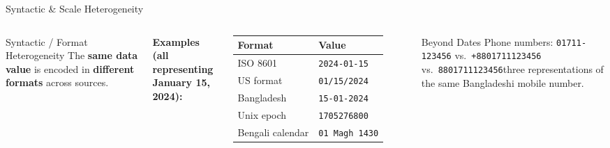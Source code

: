 \documentclass[aspectratio=169,10pt]{beamer}
\begin{document}
\begin{frame}{Syntactic \& Scale Heterogeneity}
  \begin{columns}[T]
      \begin{block}{Syntactic / Format Heterogeneity}
        The \textbf{same data value} is encoded in \textbf{different formats} across sources.
      \end{block}
      \vspace{4pt}
      \textbf{Examples (all representing January 15, 2024):}
      \vspace{2pt}
      \renewcommand{\arraystretch}{1.2}
      \begin{tabular}{ll}
        \toprule
        \textbf{Format} & \textbf{Value} \\
        \midrule
        ISO 8601         & \texttt{2024-01-15} \\
        US format        & \texttt{01/15/2024} \\
        Bangladesh      & \texttt{15-01-2024} \\
        Unix epoch       & \texttt{1705276800} \\
        Bengali calendar & \texttt{01 Magh 1430} \\
        \bottomrule
      \end{tabular}
      \vspace{4pt}
      \begin{exampleblock}{Beyond Dates}
        Phone numbers: \texttt{01711-123456} vs.\ \texttt{+8801711123456} vs.\ \texttt{8801711123456}\textemdash three representations of the same Bangladeshi mobile number.
      \end{exampleblock}


\end{columns}
\end{frame}
\end{document}
